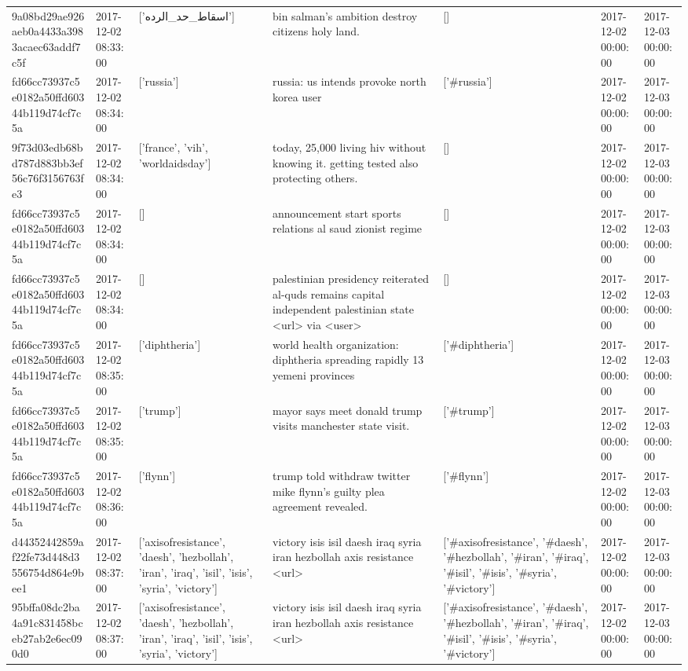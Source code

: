 \begin{tabular}{lllllll}
9a08bd29ae926aeb0a4433a3983acaec63addf7c5f & 2017-12-02 08:33:00 & ['اسقاط_حد_الرده'] & bin salman's ambition destroy citizens holy land. & [] & 2017-12-02 00:00:00 & 2017-12-03 00:00:00 \\
fd66cc73937c5e0182a50ffd60344b119d74cf7c5a & 2017-12-02 08:34:00 & ['russia'] & russia: us intends provoke north korea user & ['#russia'] & 2017-12-02 00:00:00 & 2017-12-03 00:00:00 \\
9f73d03edb68bd787d883bb3ef56c76f3156763fe3 & 2017-12-02 08:34:00 & ['france', 'vih', 'worldaidsday'] & today, 25,000 living hiv without knowing it. getting tested also protecting others. & [] & 2017-12-02 00:00:00 & 2017-12-03 00:00:00 \\
fd66cc73937c5e0182a50ffd60344b119d74cf7c5a & 2017-12-02 08:34:00 & [] & announcement start sports relations al saud zionist regime & [] & 2017-12-02 00:00:00 & 2017-12-03 00:00:00 \\
fd66cc73937c5e0182a50ffd60344b119d74cf7c5a & 2017-12-02 08:34:00 & [] & palestinian presidency reiterated al-quds remains capital independent palestinian state <url> via <user> & [] & 2017-12-02 00:00:00 & 2017-12-03 00:00:00 \\
fd66cc73937c5e0182a50ffd60344b119d74cf7c5a & 2017-12-02 08:35:00 & ['diphtheria'] & world health organization: diphtheria spreading rapidly 13 yemeni provinces & ['#diphtheria'] & 2017-12-02 00:00:00 & 2017-12-03 00:00:00 \\
fd66cc73937c5e0182a50ffd60344b119d74cf7c5a & 2017-12-02 08:35:00 & ['trump'] & mayor says meet donald trump visits manchester state visit. & ['#trump'] & 2017-12-02 00:00:00 & 2017-12-03 00:00:00 \\
fd66cc73937c5e0182a50ffd60344b119d74cf7c5a & 2017-12-02 08:36:00 & ['flynn'] & trump told withdraw twitter mike flynn's guilty plea agreement revealed. & ['#flynn'] & 2017-12-02 00:00:00 & 2017-12-03 00:00:00 \\
d44352442859af22fe73d448d3556754d864e9bee1 & 2017-12-02 08:37:00 & ['axisofresistance', 'daesh', 'hezbollah', 'iran', 'iraq', 'isil', 'isis', 'syria', 'victory'] & victory isis isil daesh iraq syria iran hezbollah axis resistance <url> & ['#axisofresistance', '#daesh', '#hezbollah', '#iran', '#iraq', '#isil', '#isis', '#syria', '#victory'] & 2017-12-02 00:00:00 & 2017-12-03 00:00:00 \\
95bffa08dc2ba4a91c831458bceb27ab2e6ec090d0 & 2017-12-02 08:37:00 & ['axisofresistance', 'daesh', 'hezbollah', 'iran', 'iraq', 'isil', 'isis', 'syria', 'victory'] & victory isis isil daesh iraq syria iran hezbollah axis resistance <url> & ['#axisofresistance', '#daesh', '#hezbollah', '#iran', '#iraq', '#isil', '#isis', '#syria', '#victory'] & 2017-12-02 00:00:00 & 2017-12-03 00:00:00 \\

\end{tabular}
